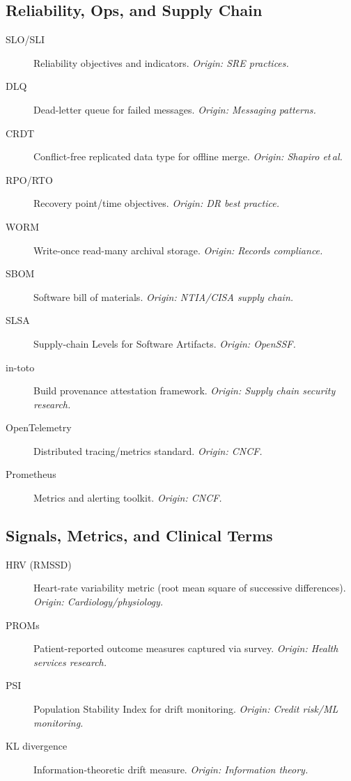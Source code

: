 \documentclass[11pt]{article}
\theoremstyle{plain}
\begin{document}
\subsection*{Reliability, Ops, and Supply Chain}
\begin{description}
  \item[SLO/SLI] Reliability objectives and indicators. \emph{Origin: SRE practices.}
  \item[DLQ] Dead-letter queue for failed messages. \emph{Origin: Messaging patterns.}
  \item[CRDT] Conflict-free replicated data type for offline merge. \emph{Origin: Shapiro et\,al.}
  \item[RPO/RTO] Recovery point/time objectives. \emph{Origin: DR best practice.}
  \item[WORM] Write-once read-many archival storage. \emph{Origin: Records compliance.}
  \item[SBOM] Software bill of materials. \emph{Origin: NTIA/CISA supply chain.}
  \item[SLSA] Supply-chain Levels for Software Artifacts. \emph{Origin: OpenSSF.}
  \item[in-toto] Build provenance attestation framework. \emph{Origin: Supply chain security research.}
  \item[OpenTelemetry] Distributed tracing/metrics standard. \emph{Origin: CNCF.}
  \item[Prometheus] Metrics and alerting toolkit. \emph{Origin: CNCF.}
\end{description}

\subsection*{Signals, Metrics, and Clinical Terms}
\begin{description}
  \item[HRV (RMSSD)] Heart-rate variability metric (root mean square of successive differences). \emph{Origin: Cardiology/physiology.}
  \item[PROMs] Patient-reported outcome measures captured via survey. \emph{Origin: Health services research.}
  \item[PSI] Population Stability Index for drift monitoring. \emph{Origin: Credit risk/ML monitoring.}
  \item[KL divergence] Information-theoretic drift measure. \emph{Origin: Information theory.}
\end{description}
\end{document}
